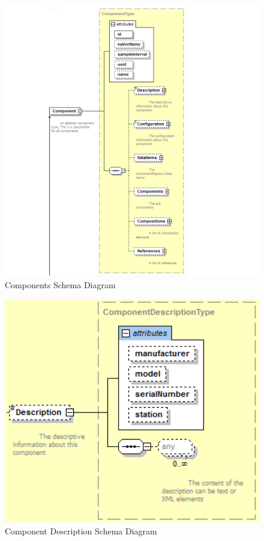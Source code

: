 \begin{figure}[ht]
  \centering
    \includegraphics[width=1.0\textwidth]{figures/Components Schema.png}
  \caption{Components Schema Diagram}
  \label{fig:Components Schema Diagram}
\end{figure}

\FloatBarrier


\begin{figure}[ht]
  \centering
    \includegraphics[width=1.0\textwidth]{figures/Component Description Schema.png}
  \caption{Component Description Schema Diagram}
  \label{fig:Component Description Schema Diagram}
\end{figure}


